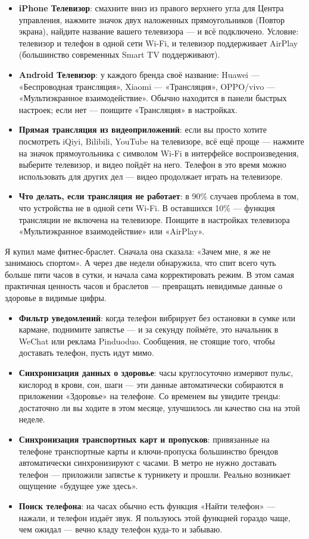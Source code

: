 \begin{itemize}
  \item \textbf{iPhone Телевизор}: смахните вниз из правого верхнего угла для Центра управления, нажмите значок двух наложенных прямоугольников (Повтор экрана), найдите название вашего телевизора — и всё подключено. Условие: телевизор и телефон в одной сети Wi-Fi, и телевизор поддерживает AirPlay (большинство современных Smart TV поддерживают).
  \item \textbf{Android Телевизор}: у каждого бренда своё название: Huawei — «Беспроводная трансляция», Xiaomi — «Трансляция», OPPO/vivo — «Мультиэкранное взаимодействие». Обычно находится в панели быстрых настроек; если нет — поищите «Трансляция» в настройках.
  \item \textbf{Прямая трансляция из видеоприложений}: если вы просто хотите посмотреть iQiyi, Bilibili, YouTube на телевизоре, всё ещё проще — нажмите на значок прямоугольника с символом Wi-Fi в интерфейсе воспроизведения, выберите телевизор, и видео пойдёт на него. Телефон в это время можно использовать для других дел — видео продолжает играть на телевизоре.
  \item \textbf{Что делать, если трансляция не работает}: в 90\% случаев проблема в том, что устройства не в одной сети Wi-Fi. В оставшихся 10\% — функция трансляции не включена на телевизоре. Поищите в настройках телевизора «Мультиэкранное взаимодействие» или «AirPlay».
\end{itemize}


Я купил маме фитнес-браслет. Сначала она сказала: «Зачем мне, я же не занимаюсь спортом». А через две недели обнаружила, что спит всего чуть больше пяти часов в сутки, и начала сама корректировать режим. В этом самая практичная ценность часов и браслетов — превращать невидимые данные о здоровье в видимые цифры.

\begin{itemize}
  \item \textbf{Фильтр уведомлений}: когда телефон вибрирует без остановки в сумке или кармане, поднимите запястье — и за секунду поймёте, это начальник в WeChat или реклама Pinduoduo. Сообщения, не стоящие того, чтобы доставать телефон, пусть идут мимо.
  \item \textbf{Синхронизация данных о здоровье}: часы круглосуточно измеряют пульс, кислород в крови, сон, шаги — эти данные автоматически собираются в приложении «Здоровье» на телефоне. Со временем вы увидите тренды: достаточно ли вы ходите в этом месяце, улучшилось ли качество сна на этой неделе.
  \item \textbf{Синхронизация транспортных карт и пропусков}: привязанные на телефоне транспортные карты и ключи-пропуска большинство брендов автоматически синхронизируют с часами. В метро не нужно доставать телефон — приложили запястье к турникету и прошли. Реально возникает ощущение «будущее уже здесь».
  \item \textbf{Поиск телефона}: на часах обычно есть функция «Найти телефон» — нажали, и телефон издаёт звук. Я пользуюсь этой функцией гораздо чаще, чем ожидал — вечно кладу телефон куда-то и забываю.
\end{itemize}

